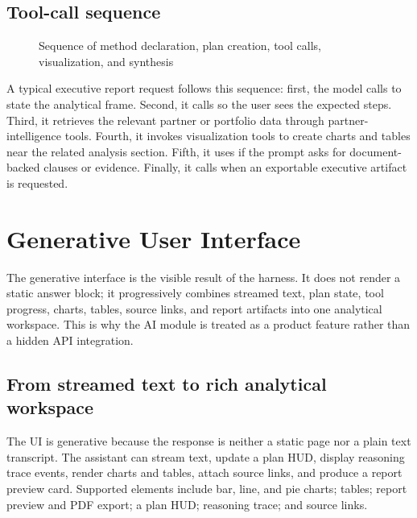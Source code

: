\subsection{Tool-call sequence}
\begin{figure}[htbp]
  \centering
  \caption{Sequence of method declaration, plan creation, tool calls, visualization, and synthesis}
\end{figure}
A typical executive report request follows this sequence: first, the model calls  to state the analytical frame. Second, it calls  so the user sees the expected steps. Third, it retrieves the relevant partner or portfolio data through partner-intelligence tools. Fourth, it invokes visualization tools to create charts and tables near the related analysis section. Fifth, it uses  if the prompt asks for document-backed clauses or evidence. Finally, it calls  when an exportable executive artifact is requested.
\section{Generative User Interface}
The generative interface is the visible result of the harness. It does not render a static answer block; it progressively combines streamed text, plan state, tool progress, charts, tables, source links, and report artifacts into one analytical workspace. This is why the AI module is treated as a product feature rather than a hidden API integration.

\subsection{From streamed text to rich analytical workspace}
The UI is generative because the response is neither a static page nor a plain text transcript. The assistant can stream text, update a plan HUD, display reasoning trace events, render charts and tables, attach source links, and produce a report preview card. Supported elements include bar, line, and pie charts; tables; report preview and PDF export; a plan HUD; reasoning trace; and source links.

